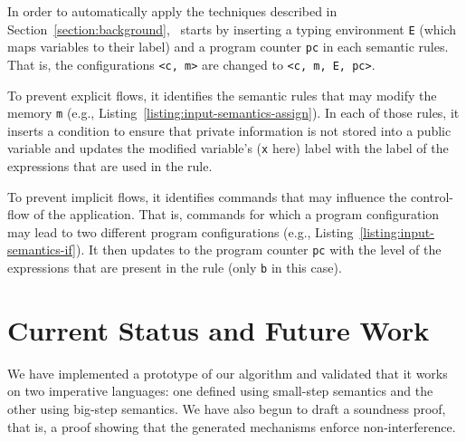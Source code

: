 \documentclass[sigplan,10pt]{acmart}\settopmatter{printfolios=true,printccs=false,printacmref=false}
\begin{document}
In order to automatically apply the techniques described in Section~\ref{section:background}, \ottifc\ starts by inserting a typing environment \lstinline{E} (which maps variables to their label) and a program counter \lstinline{pc} in each semantic rules. That is, the configurations \lstinline{<c, m>} are changed to \lstinline{<c, m, E, pc>}.

To prevent explicit flows, it identifies the semantic rules that may modify the memory \lstinline{m} (e.g., Listing~\ref{listing:input-semantics-assign}). In each of those rules, it inserts a condition to ensure that private information is not stored into a public variable and updates the modified variable's (\lstinline{x} here) label with the label of the expressions that are used in the rule.


To prevent implicit flows, it identifies commands that may influence the control-flow of the application. That is, commands for which a program configuration may lead to two different program configurations (e.g., Listing~\ref{listing:input-semantics-if}). It then updates to the program counter \lstinline{pc} with the level of the expressions that are present in the rule (only \lstinline{b} in this case).
% 

\section{Current Status and Future Work}
We have implemented a prototype of our algorithm and validated that it works on two  imperative languages: one defined using small-step semantics and the other using big-step semantics. We have also begun to draft a soundness proof, that is, a proof showing that the generated mechanisms enforce non-interference.
\end{document}
